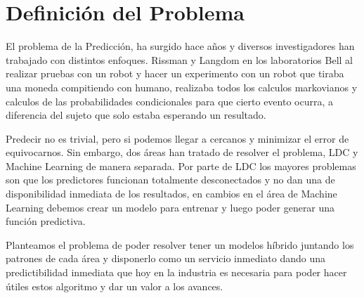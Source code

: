 

\section{Definición del Problema}


El problema de la Predicción, ha surgido hace años y diversos investigadores han trabajado con distintos enfoques. Rissman y Langdom en los laboratorios Bell al realizar pruebas con un robot y hacer un experimento con un robot que tiraba una moneda compitiendo con humano, realizaba todos los calculos markovianos y calculos de las probabilidades condicionales para que cierto evento ocurra, a diferencia del sujeto que solo estaba esperando un resultado.

Predecir no es trivial, pero si podemos llegar a cercanos y minimizar el error de equivocarnos. Sin embargo, dos áreas han tratado de resolver el problema, LDC y Machine Learning de manera separada. Por parte de LDC los mayores problemas son que los predictores funcionan totalmente desconectados y no dan una de disponibilidad inmediata de los resultados, en cambios en el área de Machine Learning debemos crear un modelo para entrenar y luego poder generar una función predictiva.

Planteamos el problema de poder resolver tener un modelos híbrido juntando los patrones de cada área y disponerlo como un servicio inmediato dando una predictibilidad inmediata que hoy en la industria es necesaria para poder hacer útiles estos algoritmo y dar un valor a los avances.
 